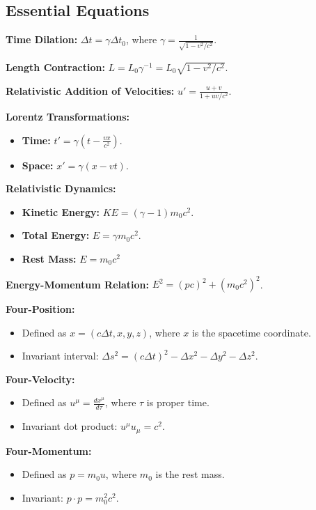 \documentclass{article}
\newcommand{\eqbox}[1]{\begin{tcolorbox}[colback=gray!10] #1 \end{tcolorbox}}
\begin{document}
\subsection{Essential Equations}
\eqbox{
\textbf{Time Dilation:} $\Delta t = \gamma \Delta t_0$, where $\gamma = \frac{1}{\sqrt{1 - v^2/c^2}}$.
}

\eqbox{
\textbf{Length Contraction:} $L = L_0 \gamma^{-1} = L_0 \sqrt{1 - v^2/c^2}$.
}

\eqbox{
\textbf{Relativistic Addition of Velocities:} $u' = \displaystyle\frac{u + v}{1 + uv/c^2}$.
}

\eqbox{
\textbf{Lorentz Transformations:}
\begin{itemize}
    \item \textbf{Time:} $t' = \gamma(t - \frac{vx}{c^2})$.
    \item \textbf{Space:} $x' = \gamma(x - vt)$.
\end{itemize}
}

\eqbox{
\textbf{Relativistic Dynamics:}
\begin{itemize}
    \item \textbf{Kinetic Energy:} $KE = (\gamma - 1)m_0c^2$.
    \item \textbf{Total Energy:} $E = \gamma m_0c^2$.
    \item \textbf{Rest Mass: } $E = m_0c^2$
\end{itemize}
}

\eqbox{
\textbf{Energy-Momentum Relation:} $E^2 = (pc)^2 + (m_0c^2)^2$.
}

\eqbox{
\textbf{Four-Position:}
\begin{itemize}
    \item Defined as $x = (c\Delta t, x, y, z)$, where $x$ is the spacetime coordinate.
    \item Invariant interval: $\Delta s^2 = (c \Delta t)^2 - \Delta x^2 -  \Delta y^2 - \Delta z^2$.
\end{itemize}
}

\eqbox{
\textbf{Four-Velocity:}
\begin{itemize}
    \item Defined as $u^\mu = \frac{dx^\mu}{d\tau}$, where $\tau$ is proper time.
    \item Invariant dot product: $u^\mu u_\mu = c^2$.
\end{itemize}
}

\eqbox{
\textbf{Four-Momentum:}
\begin{itemize}
    \item Defined as $p = m_0 u$, where $m_0$ is the rest mass.
    \item Invariant: $p \cdot p = m_0^2c^2$.
\end{itemize}
}
\end{document}
